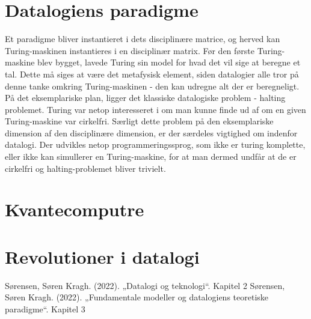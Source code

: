\documentclass[11pt]{article}
\begin{document}
\section{Datalogiens paradigme}
\label{sec:org7557f08}
Et paradigme bliver instantieret i dets disciplinære matrice, og herved kan Turing-maskinen
instantieres i en disciplinær matrix. Før den første Turing-maskine blev bygget, lavede Turing sin
model for hvad det vil sige at beregne et tal\cite{kap3}. Dette må siges at være det metafysisk element, siden
datalogier alle tror på denne tanke omkring Turing-maskinen - den kan udregne alt der er
beregneligt.
På det eksemplariske plan, ligger det klassiske datalogiske problem - halting problemet. Turing var
netop interesseret i om man kunne finde ud af om en given Turing-maskine var cirkelfri\cite{kap3}.
Særligt dette problem på den eksemplariske dimension af den disciplinære dimension, er der særdeles
vigtighed om indenfor datalogi. Der udvikles netop programmeringssprog, som ikke er turing
komplette, eller ikke kan simullerer en Turing-maskine, for at man dermed undfår at de er cirkelfri
og halting-problemet bliver trivielt.

\section{Kvantecomputre}
\label{sec:org2499a42}

\section{Revolutioner i datalogi}
\label{sec:org87ee048}

\begin{thebibliography}{9}
Sørensen, Søren Kragh. (2022). „Datalogi og teknologi“. Kapitel 2
Sørensen, Søren Kragh. (2022). „Fundamentale modeller og datalogiens teoretiske paradigme“. Kapitel 3

\end{thebibliography}
\end{document}
